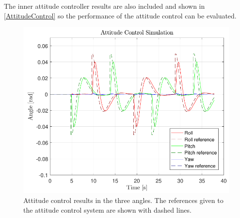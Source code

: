 The inner attitude controller results are also included and shown in \autoref{AttitudeControl} so the performance of the attitude control can be evaluated. 
\begin{figure}[H]
	\centering
	\includegraphics[scale=0.5]{figures/AttitudeControl}
	\caption{Attitude control results in the three angles. The references given to the attitude control system are shown with dashed lines.}
	\label{AttitudeControl}
\end{figure}


